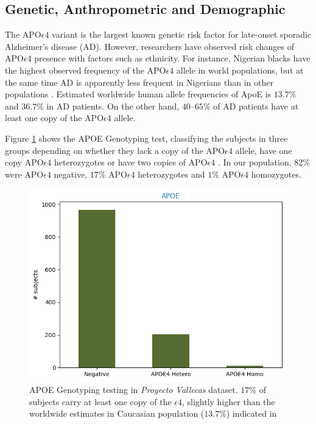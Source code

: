 \documentclass[11pt]{article}
\theoremstyle{definition}
\theoremstyle{remark}
\begin{document}
\subsection{Genetic, Anthropometric and Demographic}
\label{ssse:ant}
The APO$\epsilon4$ variant is the largest known genetic risk factor for late-onset sporadic Alzheimer's disease (AD). However, researchers have observed risk changes of APO$\epsilon4$ presence with factors such as ethnicity. For instance, Nigerian blacks have the highest observed frequency of the APO$\epsilon4$ allele in world populations, but at the same time AD is apparently less frequent in Nigerians than in other populations \cite{sepehrnia1989genetic}.
Estimated worldwide human allele frequencies of ApoE is $13.7\%$ and $36.7\%$ in AD patients. On the other hand, $40–65\%$ of AD patients have at least one copy of the APO$\epsilon4$ allele.

Figure \ref{fig:apoe} shows the APOE Genotyping test, classifying the subjects in three groups depending on whether they lack a copy of the APO$\epsilon4$ allele, have one copy APO$\epsilon4$ heterozygotes or have two copies of APO$\epsilon4$ \cite{farrer1997effects}. In our population, $82\%$ were APO$\epsilon4$ negative, $17\%$ APO$\epsilon4$ heterozygotes and $1\%$ APO$\epsilon4$ homozygotes. 

\begin{figure}[H]
        \centering
        \includegraphics[keepaspectratio, width=0.6\linewidth]{figures/Fig_apoe}
        \caption{APOE Genotyping testing in \emph{Proyecto Vallecas} dataset. $17\%$ of subjects carry at least one copy of the $\epsilon4$, slightly higher than the worldwide estimates in Caucasian population ($13.7\%$) indicated in \cite{farrer1997effects}} 
        \label{fig:apoe}
\end{figure}
\end{document}

